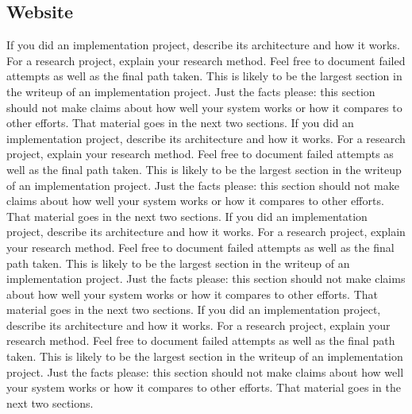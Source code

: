 \documentclass{acm_proc_article-sp}
\begin{document}
\subsection{Website}
If you did an implementation project, describe its architecture and how it works. For a research project, explain your research method. Feel free to document failed attempts as well as the final path taken. This is likely to be the largest section in the writeup of an implementation project. Just the facts please: this section should not make claims about how well your system works or how it compares to other efforts. That material goes in the next two sections. If you did an implementation project, describe its architecture and how it works. For a research project, explain your research method. Feel free to document failed attempts as well as the final path taken. This is likely to be the largest section in the writeup of an implementation project. Just the facts please: this section should not make claims about how well your system works or how it compares to other efforts. That material goes in the next two sections. If you did an implementation project, describe its architecture and how it works. For a research project, explain your research method. Feel free to document failed attempts as well as the final path taken. This is likely to be the largest section in the writeup of an implementation project. Just the facts please: this section should not make claims about how well your system works or how it compares to other efforts. That material goes in the next two sections. If you did an implementation project, describe its architecture and how it works. For a research project, explain your research method. Feel free to document failed attempts as well as the final path taken. This is likely to be the largest section in the writeup of an implementation project. Just the facts please: this section should not make claims about how well your system works or how it compares to other efforts. That material goes in the next two sections.
\end{document}

